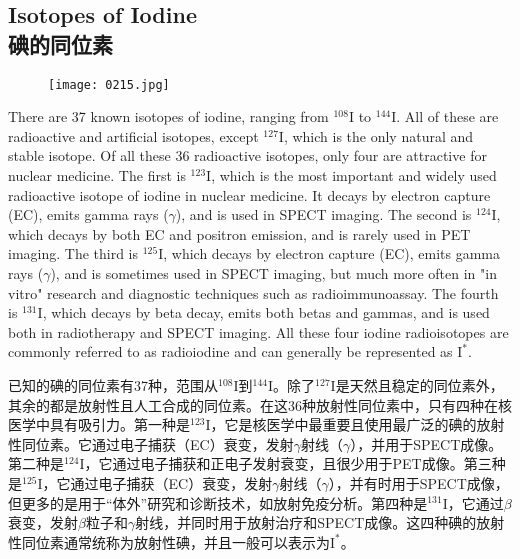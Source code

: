 \documentclass[dvipsnames, svgnames,a4paper,11pt]{article}
\begin{document}
\subsection{Isotopes of Iodine\\碘的同位素} 


\begin{figure}[h]
	\centering
    \texttt{[image: 0215.jpg]}  
     \label{fig269}
\end{figure}


There are 37 known isotopes of iodine, ranging from \(\mathrm{^{108}I}\) to \(\mathrm{^{144}I}\). All of these are radioactive and artificial isotopes, except \(\mathrm{^{127}I}\), which is the only natural and stable isotope. Of all these 36 radioactive isotopes, only four are attractive for nuclear medicine.  The first is \(\mathrm{^{123}I}\), which is the most important and widely used radioactive isotope of iodine in nuclear medicine. It decays by electron capture (EC), emits gamma rays (\(\gamma\)), and is used in SPECT imaging. The second is \(\mathrm{^{124}I}\), which decays by both EC and positron emission, and is rarely used in PET imaging. The third is \(\mathrm{^{125}I}\), which decays by electron capture (EC), emits gamma rays (\(\gamma\)), and is sometimes used in SPECT imaging, but much more often in "in vitro" research and diagnostic techniques such as radioimmunoassay. The fourth is \(\mathrm{^{131}I}\), which decays by beta decay, emits both betas and gammas, and is used both in radiotherapy and SPECT imaging.  All these four iodine radioisotopes are commonly referred to as radioiodine and can generally be represented as \(\mathrm{I^*}\).


已知的碘的同位素有37种，范围从\(\mathrm{^{108}I}\)到\(\mathrm{^{144}I}\)。除了\(\mathrm{^{127}I}\)是天然且稳定的同位素外，其余的都是放射性且人工合成的同位素。在这36种放射性同位素中，只有四种在核医学中具有吸引力。第一种是\(\mathrm{^{123}I}\)，它是核医学中最重要且使用最广泛的碘的放射性同位素。它通过电子捕获（EC）衰变，发射$\gamma$射线（\(\gamma\)），并用于SPECT成像。第二种是\(\mathrm{^{124}I}\)，它通过电子捕获和正电子发射衰变，且很少用于PET成像。第三种是\(\mathrm{^{125}I}\)，它通过电子捕获（EC）衰变，发射$\gamma$射线（\(\gamma\)），并有时用于SPECT成像，但更多的是用于“体外”研究和诊断技术，如放射免疫分析。第四种是\(\mathrm{^{131}I}\)，它通过$\beta$衰变，发射$\beta$粒子和$\gamma$射线，并同时用于放射治疗和SPECT成像。这四种碘的放射性同位素通常统称为放射性碘，并且一般可以表示为\(\mathrm{I^*}\)。
\end{document}
